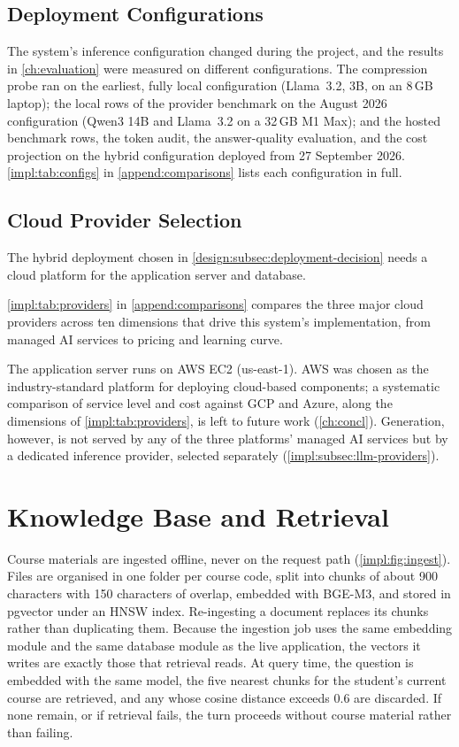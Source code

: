 \subsection{Deployment Configurations}
\label{impl:subsec:configs}

The system's inference configuration changed during the project, and the
results in \autoref{ch:evaluation} were measured on different configurations.
The compression probe ran on the earliest, fully local configuration
(Llama~3.2, 3B, on an 8\,GB laptop); the local rows of the provider benchmark
on the August 2026 configuration (Qwen3 14B and Llama~3.2 on a 32\,GB M1
Max); and the hosted benchmark rows, the token audit, the answer-quality
evaluation, and the cost projection on the hybrid configuration deployed from
27 September 2026. \autoref{impl:tab:configs} in \autoref{append:comparisons}
lists each configuration in full.


\subsection{Cloud Provider Selection}
\label{impl:subsec:provider}

The hybrid deployment chosen in \autoref{design:subsec:deployment-decision}
needs a cloud platform for the application server and database.

\autoref{impl:tab:providers} in \autoref{append:comparisons} compares the
three major cloud providers across ten dimensions that drive this system's
implementation, from managed AI services to pricing and learning curve.

The application server runs on AWS EC2 (us-east-1). AWS was chosen as the
industry-standard platform for deploying cloud-based components; a systematic
comparison of service level and cost against GCP and Azure, along the
dimensions of \autoref{impl:tab:providers}, is left to future work
(\autoref{ch:concl}).
Generation, however, is not served by any of the three platforms' managed AI
services but by a dedicated inference provider, selected separately
(\autoref{impl:subsec:llm-providers}).

\section{Knowledge Base and Retrieval}
\label{impl:sec:retrieval}

Course materials are ingested offline, never on the request path
(\autoref{impl:fig:ingest}). Files are organised in one folder per course
code, split into chunks of about 900 characters with 150 characters of
overlap, embedded with BGE-M3, and stored in pgvector under an HNSW index.
Re-ingesting a document replaces its chunks rather than duplicating them.
Because the ingestion job uses the same embedding module and the same
database module as the live application, the vectors it writes are exactly
those that retrieval reads. At query time, the question is embedded with the
same model, the five nearest chunks for the student's current course are
retrieved, and any whose cosine distance exceeds 0.6 are discarded. If none
remain, or if retrieval fails, the turn proceeds without course material
rather than failing.


